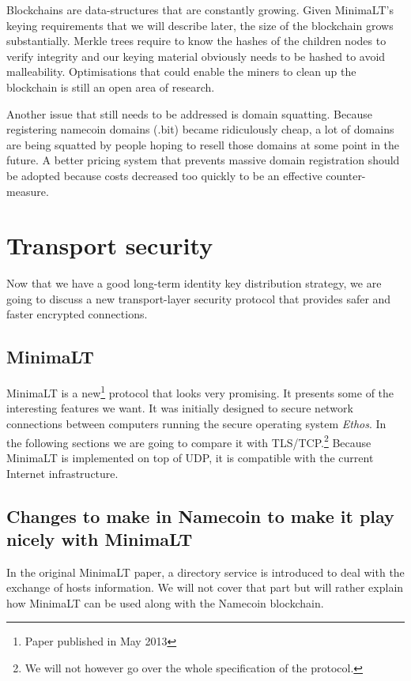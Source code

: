 \documentclass{vldb}
\begin{document}
Blockchains are data-structures that are constantly growing. Given MinimaLT's keying requirements that we will describe later, the size of the blockchain grows substantially. Merkle trees require to know the hashes of the children nodes to verify integrity and our keying material obviously needs to be hashed to avoid malleability. Optimisations that could enable the miners to clean up the blockchain is still an open area of research.

Another issue that still needs to be addressed is domain squatting\cite{domainSquatting}. Because registering namecoin domains (.bit) became ridiculously cheap, a lot of domains are being squatted by people hoping to resell those domains at some point in the future. A better pricing system that prevents massive domain registration should be adopted because costs decreased too quickly to be an effective counter-measure.

\section{Transport security}

Now that we have a good long-term identity key distribution strategy, we are going to discuss a new transport-layer security protocol that provides safer and faster encrypted connections.
\subsection{MinimaLT}
MinimaLT\cite{MinimaLT} is a new\footnote{Paper published in May 2013} protocol that looks very promising.
It presents some of the interesting features we want. It was initially designed to secure network connections between computers running the secure operating system \emph{Ethos}. In the following sections we are going to compare it with TLS/TCP.\footnote{We will not however go over the whole specification of the protocol.}  Because MinimaLT is implemented on top of UDP, it is compatible with the current Internet infrastructure.

\subsection{Changes to make in Namecoin to make it play nicely with MinimaLT}

In the original MinimaLT paper, a directory service is introduced to deal with the exchange of hosts information. We will not cover that part but will rather explain how MinimaLT can be used along with the Namecoin blockchain.
\end{document}
